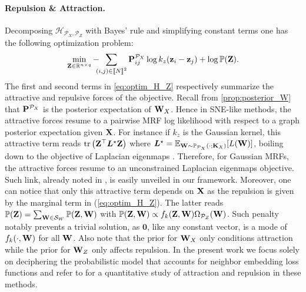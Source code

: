 \paragraph{Repulsion \& Attraction.}
Decomposing $\mathcal{H}_{\mathcal{P}_X, \mathcal{P}_Z}$ with Bayes' rule and simplifying constant terms one has the following optimization problem: 
\begin{align}\label{eq:optim_H_Z}
    \min_{\Zb \in \mathbb{R}^{n \times q}} -\hspace{-0.2cm}\sum_{(i,j) \in \integ{N}^2} \Pb^{\mathcal{P}_X}_{ij}\log k_z(\mathbf{z}_{i} - \mathbf{z}_{j}) + \log \mathbb{P}(\Zb).
\end{align}
The first and second terms in \cref{eq:optim_H_Z} respectively summarize the attractive and repulsive forces of the objective. Recall from \cref{prop:posterior_W}
that $\mathbf{P}^{\mathcal{P}_X}$ is the posterior expectation of ${\mathbf{W}}_{X}$. Hence in SNE-like methods, the attractive forces resume to a pairwise MRF log likelihood with respect to a graph posterior expectation given $\mathbf{X}$. For instance if $k_z$ is the Gaussian kernel, this attractive term reads $\operatorname{tr} \left(\mathbf{Z}^\top \bm{L}^\star \mathbf{Z} \right)$ where $\bm{L}^\star = \mathbb{E}_{{\mathbf{W}} \sim \mathbb{P}_{\mathcal{P}_X}(\cdot;\mathbf{K}_{X})}[L({\mathbf{W}})]$, boiling down to the objective of Laplacian eigenmaps \citep{belkin2003laplacian}. Therefore, for Gaussian MRFs, the attractive forces resume to an unconstrained Laplacian eigenmaps objective. Such link, already noted in \citep{carreira2010elastic}, is easily unveiled in our framework. Moreover, one can notice that only this attractive term depends on $\mathbf{X}$ as the repulsion is given by the marginal term in (\ref{eq:optim_H_Z}). The latter reads $\mathbb{P}(\mathbf{Z}) = \sum_{{\mathbf{W}} \in \mathcal{S}_{W}} \mathbb{P}(\mathbf{Z}, {\mathbf{W}})$ with $\mathbb{P}(\mathbf{Z}, {\mathbf{W}}) \propto f_k(\mathbf{Z}, {\mathbf{W}})\Omega_{\mathcal{P}_Z}({\mathbf{W}})$. Such penalty notably prevents a trivial solution, as $\bm{0}$, like any constant vector, is a mode of $f_k(\cdot, {\mathbf{W}})$ for all ${\mathbf{W}}$. Also note that the prior for ${\mathbf{W}}_{X}$ only conditions attraction while the prior for ${\mathbf{W}}_{Z}$ only affects repulsion. In the present work we focus solely on deciphering the probabilistic model that accounts for neighbor embedding loss functions and refer to \citep{bohm2020unifying} for a quantitative study of attraction and repulsion in these methods.

